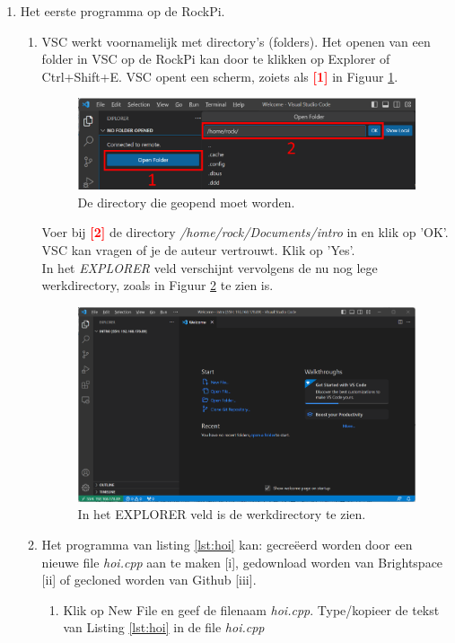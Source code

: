 \begin{enumerate}
\begin{enumerate}
\end{enumerate}  
	     \item Het eerste programma op de RockPi.
	     \begin{enumerate}
	     	\item VSC werkt voornamelijk met directory's (folders). Het openen van een folder in VSC op de RockPi kan door te klikken op Explorer  of Ctrl+Shift+E. VSC opent een scherm, zoiets als \textcolor{red}{\textbf{[1]}} in Figuur \ref{fig:vscOpenFolder}.
		    \begin{figure}[h!]
	\captionsetup{justification=centering}
	\includegraphics[width=0.8 \linewidth]{figuren/VSCopenFolder}
	\centering
	\caption{De directory die geopend moet worden.}
	\label{fig:vscOpenFolder}
\end{figure}
\newline 
Voer bij \textcolor{red}{\textbf{[2]}} de directory \textit{/home/rock/Documents/intro} in en klik op 'OK'.
VSC kan vragen of je de auteur vertrouwt. Klik op 'Yes'. \\
 In het \textit{EXPLORER} veld verschijnt vervolgens de nu nog lege werkdirectory, zoals in Figuur \ref{fig:vscExploVeld} te zien is.
 	\begin{figure}[h!]
        	\captionsetup{justification=centering}
 	        \includegraphics[width=0.6\linewidth]{figuren/VSCexplorerveld}
 	        \centering
 	        \caption{In het EXPLORER veld is de werkdirectory te zien.}
 	         \label{fig:vscExploVeld}
     \end{figure} 
\newpage %
\item Het programma van listing \ref{lst:hoi} kan:  gecreëerd worden door een nieuwe file \textit{hoi.cpp} aan te maken [i], gedownload worden van Brightspace [ii] of gecloned worden van Github [iii].
\begin{enumerate} %
 \item
 Klik op New File   en geef de filenaam \textit{hoi.cpp}.
	 Type/kopieer de tekst van Listing \ref{lst:hoi} in de file \textit{hoi.cpp}
	 

\end{enumerate}
\end{enumerate}
\end{enumerate}
